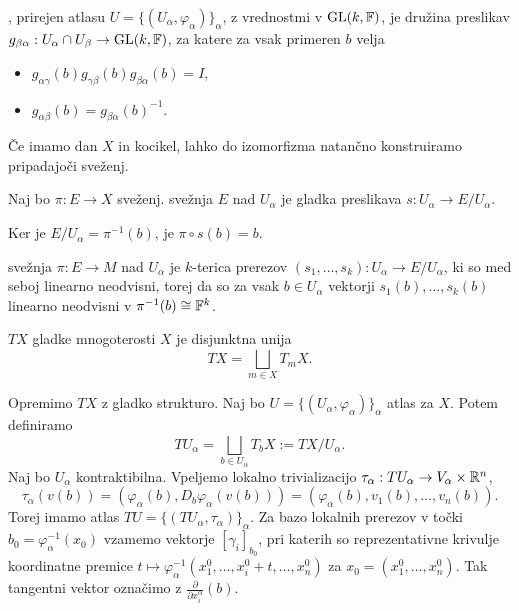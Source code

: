 \begin{definicija}
  , prirejen atlasu $U = \{(U_\alpha, \varphi_\alpha)\}_\alpha$,
  z vrednostmi v $\operatorname{GL}(k, \mathbb{F})$, je družina preslikav $g_{\beta \alpha}: U_\alpha
  \cap U_\beta \to \operatorname{GL}(k, \mathbb{F})$, za katere za vsak primeren $b$ velja
  \begin{itemize}
  \item $g_{\alpha \gamma}(b) g_{\gamma \beta}(b) g_{\beta \alpha}(b) = I$,
  \item $g_{\alpha \beta}(b) = g_{\beta \alpha}(b)^{-1}$.
  \end{itemize}
\end{definicija}

\begin{opomba}
  Če imamo dan $X$ in kocikel, lahko do izomorfizma natančno konstruiramo
  pripadajoči sveženj.
\end{opomba}

\begin{definicija}
  Naj bo $\pi: E \to X$ sveženj.
   svežnja $E$ nad $U_\alpha$ je gladka preslikava
  $s: U_\alpha \to E/U_\alpha$.
\end{definicija}

\begin{opomba}
  Ker je $E/U_\alpha = \pi^{-1}(b)$, je $\pi \circ s(b) = b$.
\end{opomba}

\begin{definicija}
   svežnja $\pi: E \to M$ nad $U_\alpha$ je $k$-terica
  prerezov $(s_1, \ldots, s_k): U_\alpha \to E/U_\alpha$, ki so med seboj
  linearno neodvisni, torej da so za vsak $b \in U_\alpha$ vektorji $s_1(b),
  \ldots, s_k(b)$ linearno neodvisni v $\pi^{-1}(b) \cong \mathbb{F}^k$.
\end{definicija}

\begin{definicija}
   $TX$ gladke mnogoterosti $X$ je disjunktna unija
  \[
	TX = \bigsqcup_{m \in X} T_m X.
  \]
\end{definicija}

Opremimo $TX$ z gladko strukturo.
Naj bo $U = \{ (U_\alpha, \varphi_\alpha) \}_\alpha$ atlas za $X$.
Potem definiramo
\[
  T U_\alpha = \bigsqcup_{b \in U_\alpha} T_b X := TX / U_\alpha.
\]
Naj bo $U_\alpha$ kontraktibilna.
Vpeljemo lokalno trivializacijo $\tau_\alpha: TU_\alpha \to V_\alpha \times
\mathbb{R}^n$,
\[
  \tau_\alpha(v(b)) = (\varphi_\alpha(b), D_b \varphi_\alpha (v(b)))
  = (\varphi_\alpha(b), v_1(b), \ldots, v_n(b)).
\]
Torej imamo atlas $TU = \{ (TU_\alpha, \tau_\alpha) \}_\alpha$.
Za bazo lokalnih prerezov v točki $b_0 = \varphi_\alpha^{-1}(x_0)$ vzamemo
vektorje $[\gamma_i]_{b_0}$, pri katerih so reprezentativne krivulje koordinatne
premice $t \mapsto \varphi_\alpha^{-1}(x_1^0, \ldots, x_i^0  + t, \ldots,
x_n^0)$ za $x_0 = (x_1^0, \ldots, x_n^0)$.
Tak tangentni vektor označimo z $\frac{\partial}{\partial x_i^\alpha}(b)$.

